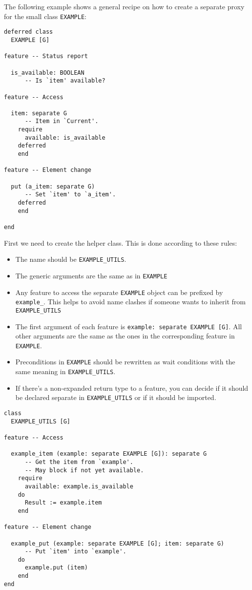 \documentclass[a4paper,10pt]{report}
\begin{document}
The following example shows a general recipe on how to create a separate proxy for the small class \lstinline!EXAMPLE!:

\begin{lstlisting}
deferred class
  EXAMPLE [G]

feature -- Status report

  is_available: BOOLEAN
      -- Is `item' available?
  
feature -- Access

  item: separate G
      -- Item in `Current'.
    require
      available: is_available
    deferred
    end

feature -- Element change

  put (a_item: separate G)
      -- Set `item' to `a_item'.
    deferred
    end

end
\end{lstlisting}

First we need to create the helper class.
This is done according to these rules:
 \begin{itemize}
  \item The name should be \lstinline!EXAMPLE_UTILS!.
  \item The generic arguments are the same as in \lstinline!EXAMPLE!
  \item Any feature to access the separate \lstinline!EXAMPLE! object can be prefixed by \lstinline!example_!.
  This helps to avoid name clashes if someone wants to inherit from \lstinline!EXAMPLE_UTILS!
  \item The first argument of each feature is \lstinline!example: separate EXAMPLE [G]!.
  All other arguments are the same as the ones in the corresponding feature in \lstinline!EXAMPLE!.
  \item Preconditions in \lstinline!EXAMPLE! should be rewritten as wait conditions with the same meaning in \lstinline!EXAMPLE_UTILS!.
  \item If there's a non-expanded return type to a feature, you can decide if it should be declared separate in \lstinline!EXAMPLE_UTILS! or if it should be imported.
 \end{itemize}

\begin{lstlisting}
class
  EXAMPLE_UTILS [G]
  
feature -- Access

  example_item (example: separate EXAMPLE [G]): separate G
      -- Get the item from `example'.
      -- May block if not yet available.
    require
      available: example.is_available
    do
      Result := example.item
    end

feature -- Element change
 
  example_put (example: separate EXAMPLE [G]; item: separate G)
      -- Put `item' into `example'.
    do
      example.put (item)
    end
end
\end{lstlisting}
\end{document}
